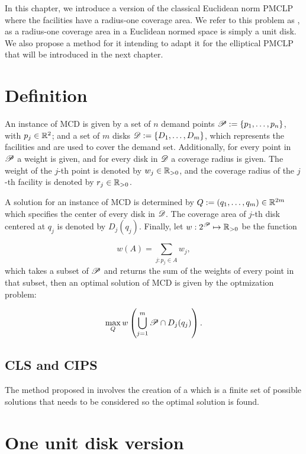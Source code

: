 In this chapter, we introduce a version of the classical Euclidean norm PMCLP where the facilities have a radius-one coverage area. We refer to this problem as , as a radius-one coverage area in a Euclidean normed space is simply a unit disk. We also propose a method for it intending to adapt it for the elliptical PMCLP that will be introduced in the next chapter.

\section{Definition}

An instance of MCD is given by a set of $n$ demand points $\mathscr{P}:=\{p_1, \dots, p_n\}$, with $p_j\in\mathbb{R}^2$; and a set of $m$ disks $\mathscr{D}:=\{D_1, \dots, D_m\}$, which represents the facilities and are used to cover the demand set. Additionally, for every point in $\mathscr{P}$ a weight is given, and for every disk in $\mathscr{D}$ a coverage radius is given. The weight of the $j$-th point is denoted by $w_j\in\mathbb{R}_{>0}$, and the coverage radius of the $j$-th facility is denoted by $r_j \in \mathbb{R}_{>0}$.

A solution for an instance of MCD is determined by $Q:=(q_1, \dots, q_m) \in \mathbb{R}^{2m}$ which specifies the center of every disk in $\mathscr{D}$.
The coverage area of $j$-th disk centered at $q_j$ is denoted by $D_j(q_j)$. Finally, let $w : 2^{\mathscr{P}} \mapsto \mathbb{R}_{>0}$ be the function

\begin{equation}
w(A) = \sum_{j : p_j \in A} w_j,
\end{equation}
which takes a subset of $\mathscr{P}$ and returns the sum of the weights of every point in that subset, then an optimal solution of MCD is given by the optmization problem:

\begin{equation}
\max_{Q} w\left(\bigcup_{j=1}^m \mathscr{P} \cap D_j(q_j)\right).
\end{equation}

\subsection{CLS and CIPS}

The method proposed in \cite{church:1984} involves the creation of a  which is a finite set of possible solutions that needs to be considered so the optimal solution is found.


\section{One unit disk version}

